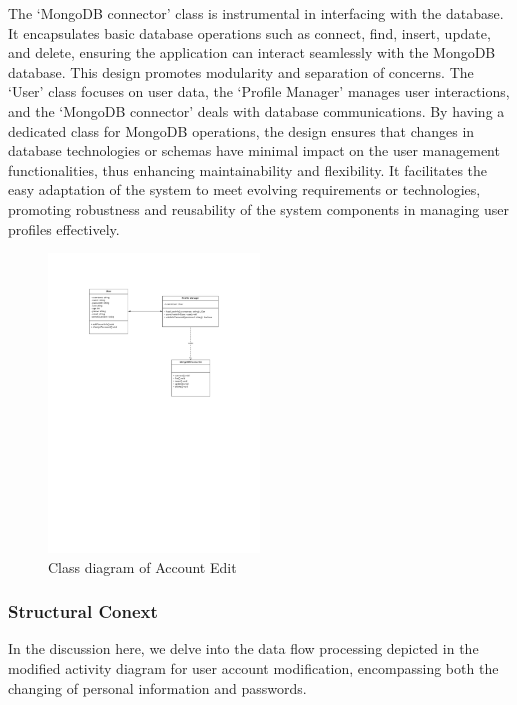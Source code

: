 \documentclass[conference]{IEEEtran}
\begin{document}
The ‘MongoDB connector’ class is instrumental in interfacing with the database. It encapsulates basic database operations such as connect, find, insert, update, and delete, ensuring the application can interact seamlessly with the MongoDB database.
This design promotes modularity and separation of concerns. The ‘User’ class focuses on user data, the ‘Profile Manager’ manages user interactions, and the ‘MongoDB connector’ deals with database communications. By having a dedicated class for MongoDB operations, the design ensures that changes in database technologies or schemas have minimal impact on the user management functionalities, thus enhancing maintainability and flexibility. It facilitates the easy adaptation of the system to meet evolving requirements or technologies, promoting robustness and reusability of the system components in managing user profiles effectively.
\begin{figure}[htbp]
	\centerline{\includegraphics[width=0.5\textwidth]{Diagram_of_Editing_Info_and_Password/Class_diagram_of_editing_and_Changing_psw.pdf}}
	\caption{Class diagram of Account Edit }
	\label{Class_diagram_of_editing_and_Changing_psw}
\end{figure}
\subsubsection{\textbf{Structural Conext }}
\textbf{ }

In the discussion here, we delve into the data flow processing depicted in the modified activity diagram for user account modification, encompassing both the changing of personal information and passwords.
\end{document}
